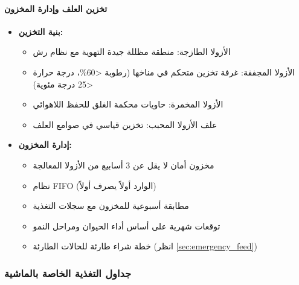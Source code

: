 \paragraph{تخزين العلف وإدارة المخزون}
\begin{itemize}
    \item \textbf{بنية التخزين:}
    \begin{itemize}
        \item الأزولا الطازجة: منطقة مظللة جيدة التهوية مع نظام رش
        \item الأزولا المجففة: غرفة تخزين متحكم في مناخها (رطوبة <60\%، درجة حرارة <25 درجة مئوية)
        \item الأزولا المخمرة: حاويات محكمة الغلق للحفظ اللاهوائي
        \item علف الأزولا المحبب: تخزين قياسي في صوامع العلف
    \end{itemize}
    \item \textbf{إدارة المخزون:}
    \begin{itemize}
        \item مخزون أمان لا يقل عن 3 أسابيع من الأزولا المعالجة
        \item نظام FIFO (الوارد أولاً يصرف أولاً)
        \item مطابقة أسبوعية للمخزون مع سجلات التغذية
        \item توقعات شهرية على أساس أداء الحيوان ومراحل النمو
        \item خطة شراء طارئة للحالات الطارئة (انظر \ref{sec:emergency_feed})
    \end{itemize}
\end{itemize}

\subsubsection{جداول التغذية الخاصة بالماشية}
\label{sec:feeding_schedules}


